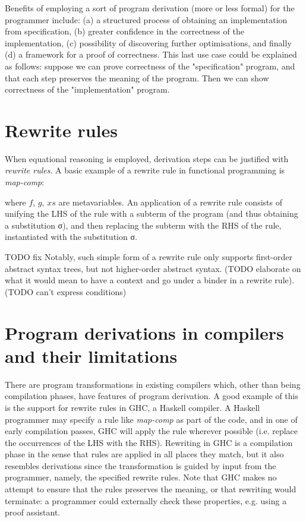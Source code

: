 \documentclass[bsc,frontabs,oneside,singlespacing,parskip,deptreport]{infthesis}
\theoremstyle{definition}
\theoremstyle{lemma}
\begin{document}
Benefits of employing a sort of program derivation (more or less
formal) for the programmer include: (a) a structured process of
obtaining an implementation from specification, (b) greater confidence
in the correctness of the implementation, (c) possibility of
discovering further optimisations, and finally (d) a framework for a
proof of correctness. This last use case could be explained as
follows: suppose we can prove correctness of the "specification"
program, and that each step preserves the meaning of the program. Then
we can show correctness of the "implementation" program.

\section{Rewrite rules}
\label{sec:rewrite-rules}

When equational reasoning is employed, derivation steps can be
justified with \textit{rewrite rules}. A basic example of a rewrite
rule in functional programming is \textit{map-comp}:


where $f$, $g$, $xs$ are metavariables. An application of a rewrite
rule consists of unifying the LHS of the rule with a subterm of the
program (and thus obtaining a substitution σ), and then replacing the
subterm with the RHS of the rule, instantiated with the substitution
σ.

TODO fix Notably, such simple form of a rewrite rule only supports first-order
abstract syntax trees, but not higher-order abstract syntax. (TODO
elaborate on what it would mean to have a context and go under a
binder in a rewrite rule). (TODO can't express conditions) 

\section{Program derivations in compilers and their limitations}
\label{sec:progr-deriv-comp}

There are program transformations in existing compilers which, other
than being compilation phases, have features of program derivation.  A
good example of this is the support for rewrite rules in GHC, a
Haskell compiler. A Haskell programmer may specify a rule like
\textit{map-comp} as part of the code, and in one of early compilation
passes, GHC will apply the rule wherever possible (i.e. replace the
occurrences of the LHS with the RHS). Rewriting in GHC is a
compilation phase in the sense that rules are applied in all places
they match, but it also resembles derivations since the transformation
is guided by input from the programmer, namely, the specified rewrite
rules. Note that GHC makes no attempt to ensure that the rules
preserves the meaning, or that rewriting would terminate: a programmer
could externally check these properties, e.g. using a proof
assistant.
\end{document}
